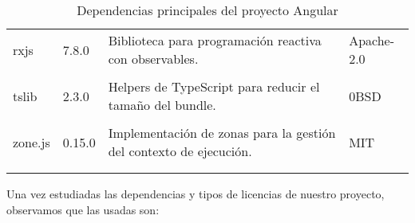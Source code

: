 \begin{longtable}[]{@{}p{}p{}p{}p{}@{}}
    \begin{minipage}[t]{0.18\columnwidth}\raggedright rxjs \end{minipage} & \begin{minipage}[t]{0.10\columnwidth}\raggedright 7.8.0 \end{minipage} & \begin{minipage}[t]{0.49\columnwidth}\raggedright Biblioteca para programación reactiva con observables. \end{minipage} & \begin{minipage}[t]{0.11\columnwidth}\raggedright Apache-2.0 \end{minipage} \\ \tabularnewline

    \begin{minipage}[t]{0.18\columnwidth}\raggedright tslib \end{minipage} & \begin{minipage}[t]{0.10\columnwidth}\raggedright 2.3.0 \end{minipage} & \begin{minipage}[t]{0.49\columnwidth}\raggedright Helpers de TypeScript para reducir el tamaño del bundle. \end{minipage} & \begin{minipage}[t]{0.11\columnwidth}\raggedright 0BSD \end{minipage} \\ \tabularnewline

    \begin{minipage}[t]{0.18\columnwidth}\raggedright zone.js \end{minipage} & \begin{minipage}[t]{0.10\columnwidth}\raggedright 0.15.0 \end{minipage} & \begin{minipage}[t]{0.49\columnwidth}\raggedright Implementación de zonas para la gestión del contexto de ejecución. \end{minipage} & \begin{minipage}[t]{0.11\columnwidth}\raggedright MIT \end{minipage} \\ \tabularnewline

    \bottomrule
    \caption{Dependencias principales del proyecto Angular}
\end{longtable}

Una vez estudiadas las dependencias y tipos de licencias de nuestro proyecto, observamos que las usadas son:

